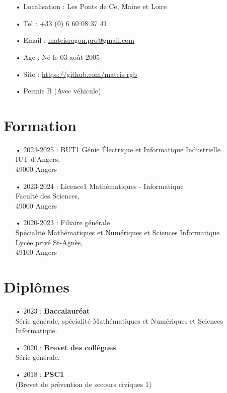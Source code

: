 \documentclass[french]{article}
\begin{document}
\RaggedRight

\section*{}

\begin{itemize}
	\item[•] Localisation : Les Ponts de Ce, Maine et Loire
	\item[•] Tel : +33 (0) 6 60 08 37 41
	\item[•] Email : \href{mailto:mateisragon.pro@gmail.com}{mateisragon.pro@gmail.com}
	\item[•] Age : Né le 03 août 2005
	\item[•] Site : \href{https://https://github.com/mateis-rgb}{https://github.com/mateis-rgb}
	\item[•]  Permis B (Avec véhicule)
\end{itemize}
	
\section*{Formation}
\begin{itemize}
	\item[• 2024-2025 :] BUT1 Génie Électrique et Informatique Industrielle \\ IUT d'Angers, \\ 49000 Angers

	\item[• 2023-2024 :] Licence1 Mathématiques - Informatique \\ Faculté des Sciences, \\ 49000 Angers
	
	\item[• 2020-2023 :] Filiaire générale \\ Spécialité Mathématiques et Numériques et Sciences Informatique \\ Lycée privé St-Agnès, \\ 49100 Angers
\end{itemize}

\section*{Diplômes}
\begin{itemize}
	\item[• 2023 :] \textbf{Baccalauréat} \\ Série générale, spécialité Mathématiques et Numériques et Sciences Informatique.
	
	\item[• 2020 :] \textbf{Brevet des collègues} \\ Série générale.

	\item[• 2018 :] \textbf{PSC1} \\ (Brevet de prévention de secours civiques 1)
\end{itemize}
\end{document}
